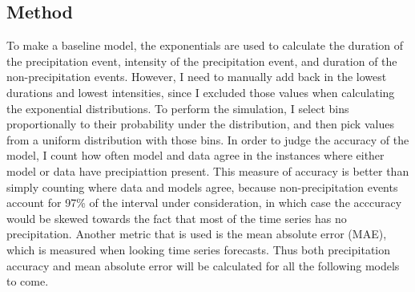 \documentclass[11pt]{report}
\begin{document}
\subsection{Method}\label{sec:sfp_m}

To make a baseline model, the exponentials are used to
calculate the duration of the precipitation event, intensity of the
precipitation event, and duration of the non-precipitation events. However,
I need to manually add back in the lowest durations and lowest
intensities, since I excluded those values when calculating the exponential
distributions. To perform the simulation, I select bins proportionally to
their probability under the distribution, and then pick values from a
uniform distribution with those bins. In order to judge the accuracy of the
model, I count how often model and data agree in the instances where either
model or data have precipiattion present.  This measure of accuracy is
better than simply counting where data and models agree, because
non-precipitation events account for 97\% of the interval under
consideration, in which case the acccuracy would be skewed towards the fact
that most of the time series has no precipitation. 
Another metric that is used is the mean absolute error (MAE), which is measured
when looking time series forecasts. Thus both precipitation accuracy and mean 
absolute error will be calculated for all the following models to come. 
\end{document}
